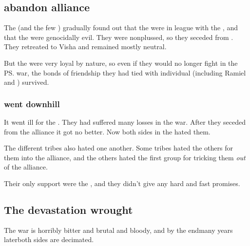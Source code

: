 \subsection[Aryothim abandon alliance]{\Aryothim{} abandon alliance}
The \aryothim{} (and the few \vorcanths{}) gradually found out that the \resphain{} were in league with the \banes, and that the \banes{} were genocidally evil. 
They were nonplussed, so they seceded from . 
They retreated to Visha and remained mostly neutral. 

But the \vorcanths{} were very loyal by nature, so even if they would no longer fight in the \ps{\resphain} war, the bonds of friendship they had tied with individual \resphain{} (including Ramiel and \Shiaraid) survived. 





\subsubsection[Aryothim went downhill]{\Aryothim{} went downhill}
It went ill for the \aryothim. 
They had suffered many losses in the war. 
After they seceded from the alliance it got no better. 
Now both sides in the \feud{} hated them. 

The different \aryoth{} tribes also hated one another. 
Some tribes hated the others for  them into the alliance, and the others hated the first group for tricking them \emph{out} of the alliance. 

Their only support were the \vorcanths, and they didn't give any hard and fast promises. 









\subsection{The devastation wrought}
The war is horribly bitter and brutal and bloody, and by the end\dash many years later\dash both sides are decimated. 

